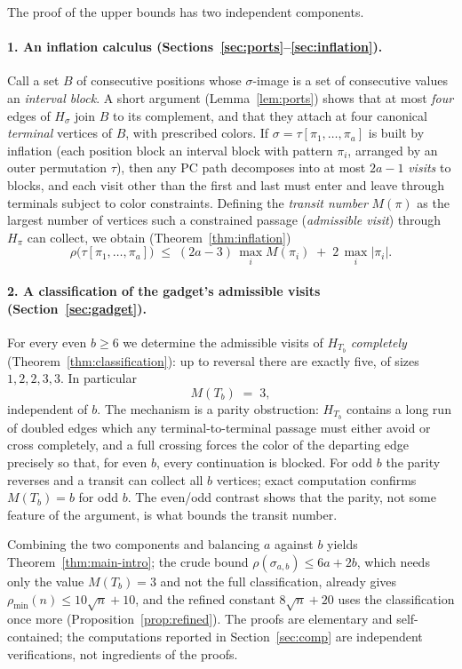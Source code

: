 \documentclass[11pt]{article}
\theoremstyle{definition}
\newcommand{\pmin}{\rho_{\min}}
\begin{document}
The proof of the upper bounds has two independent components.

\paragraph{1. An inflation calculus (Sections~\ref{sec:ports}--\ref{sec:inflation}).}
Call a set $B$ of consecutive positions whose $\sigma$-image is a set of consecutive
values an \emph{interval block}. A short argument (Lemma~\ref{lem:ports}) shows that
at most \emph{four} edges of $H_\sigma$ join $B$ to its complement, and that they
attach at four canonical \emph{terminal} vertices of $B$, with prescribed colors. If
$\sigma = \tau[\pi_1,\dots,\pi_a]$ is built by inflation (each position block an
interval block with pattern $\pi_i$, arranged by an outer permutation $\tau$), then
any PC path decomposes into at most $2a-1$ \emph{visits} to blocks, and each visit
other than the first and last must enter and leave through terminals subject to color
constraints. Defining the \emph{transit number} $M(\pi)$ as the largest number of
vertices such a constrained passage (\emph{admissible visit}) through $H_\pi$ can
collect, we obtain (Theorem~\ref{thm:inflation})
\[
\rho\bigl(\tau[\pi_1,\dots,\pi_a]\bigr) \;\le\; (2a-3)\,\max_i M(\pi_i) \;+\;
2\,\max_i |\pi_i| .
\]

\paragraph{2. A classification of the gadget's admissible visits
(Section~\ref{sec:gadget}).}
For every even $b \ge 6$ we determine the admissible visits of $H_{T_b}$
\emph{completely} (Theorem~\ref{thm:classification}): up to reversal there are
exactly five, of sizes $1, 2, 2, 3, 3$. In particular
\[
M(T_b) \;=\; 3 ,
\]
independent of $b$. The mechanism is a parity obstruction: $H_{T_b}$ contains a long
run of doubled edges which any terminal-to-terminal passage must either avoid or
cross completely, and a full crossing forces the color of the departing edge
precisely so that, for even $b$, every continuation is blocked. For odd $b$ the
parity reverses and a transit can collect all $b$ vertices; exact computation
confirms $M(T_b) = b$ for odd $b$. The even/odd contrast shows that the parity, not
some feature of the argument, is what bounds the transit number.

Combining the two components and balancing $a$ against $b$ yields
Theorem~\ref{thm:main-intro}; the crude bound $\rho(\sigma_{a,b}) \le 6a + 2b$,
which needs only the value $M(T_b) = 3$ and not the full classification, already
gives $\pmin(n) \le 10\sqrt n + 10$, and the refined constant $8\sqrt n + 20$ uses
the classification once more (Proposition~\ref{prop:refined}). The proofs are
elementary and self-contained; the computations reported in Section~\ref{sec:comp}
are independent verifications, not ingredients of the proofs.
\end{document}
